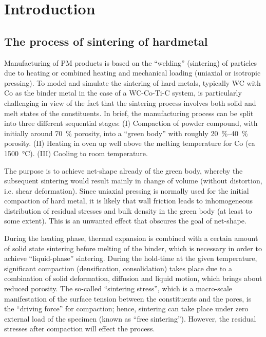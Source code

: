 \documentclass[MikaelDissertation.tex]{subfiles}
\begin{document}
\chapter{Introduction}

\section{The process of sintering of hardmetal}

Manufacturing of PM products is based on the ``welding'' (sintering) of particles due to heating or combined heating and mechanical loading (uniaxial or isotropic pressing).
To model and simulate the sintering of hard metals, typically WC with Co as the binder metal in the case of a WC-Co-Ti-C system, is particularly challenging in view of the fact that the sintering process involves both solid and melt states of the constituents.
In brief, the manufacturing process can be split into three different sequential stages:
(I) Compaction of powder compound, with initially around \SI{70}{\percent} porosity, into a ``green body'' with roughly \SIrange{20}{40}{\percent} porosity.
(II) Heating in oven up well above the melting temperature for Co (ca \SI{1500}{\celsius}).
(III) Cooling to room temperature.

The purpose is to achieve net-shape already of the green body, whereby the subsequent sintering would result mainly in change of volume (without distortion, i.e. shear deformation).
Since uniaxial pressing is normally used for the initial compaction of hard metal, it is likely that wall friction leads to inhomogeneous
distribution of residual stresses and bulk density in the green body (at least to some extent).
This is an unwanted effect that obscures the goal of net-shape.

During the heating phase, thermal expansion is combined with a certain amount of solid state sintering before melting of the binder, which is necessary in order to achieve ``liquid-phase'' sintering.
During the hold-time at the given temperature, significant compaction (densification, consolidation) takes place due to a combination of solid deformation, diffusion and liquid motion, which brings about reduced porosity.
The so-called ``sintering stress'', which is a macro-scale manifestation of the surface tension between the constituents and the pores, is the ``driving force'' for compaction; hence, sintering can take place under zero external load of the specimen (known as ``free sintering'').
However, the residual stresses after compaction will effect the process.
\end{document}
